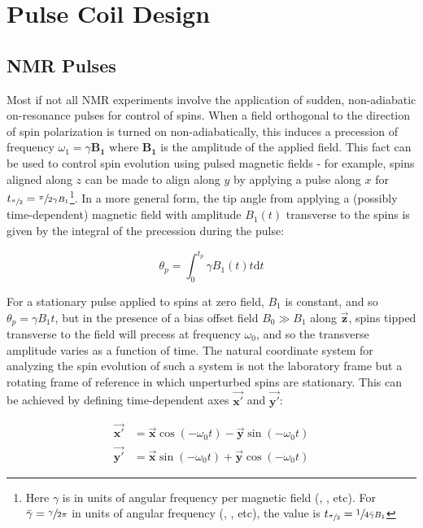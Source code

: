 \documentclass[PaulGanssle-Thesis.tex]{subfiles}
\begin{document}
\section{Pulse Coil Design}
\label{nmr.pulsecoil}
\subsection{NMR Pulses}
Most if not all NMR experiments involve the application of sudden, non-adiabatic on-resonance pulses for control of spins. When a field orthogonal to the direction of spin polarization is turned on non-adiabatically, this induces a precession of frequency $\omega_1 = \gamma\mathbf{B_1}$ where $\mathbf{B_1}$ is the amplitude of the applied field. This fact can be used to control spin evolution using pulsed magnetic fields - for example, spins aligned along $z$ can be made to align along $y$ by applying a pulse along $x$ for $t_{\sfrac{\pi}{2}} = \sfrac{\pi}{2\gamma B_1}$\footnote{Here $\gamma$ is in units of angular frequency per magnetic field (, , etc). For $\bar{\gamma} = \sfrac{\gamma}{2\pi}$ in units of angular frequency (, , etc), the value is $t_{\sfrac{\pi}{2}} = \sfrac{1}{4\bar{\gamma} B_1}$}. In a more general form, the tip angle from applying a (possibly time-dependent) magnetic field with amplitude $B_1(t)$ transverse to the spins is given by the integral of the precession during the pulse:

\begin{equation}
\label{eqn:SpinTipAngle}
\theta_p = \int_0^{t_p}\!\gamma B_1(t)t\mathrm{d}t
\end{equation}

For a stationary pulse applied to spins at zero field, $B_1$ is constant, and so $\theta_p = \gamma B_1 t$, but in the presence of a bias offset field $B_0 \gg B_1$ along $\vec{\mathbf{z}}$, spins tipped transverse to the field will precess at frequency $\omega_0$, and so the transverse amplitude varies as a function of time. The natural coordinate system for analyzing the spin evolution of such a system is not the laboratory frame but a rotating frame of reference in which unperturbed spins are stationary. This can be achieved by defining time-dependent axes $\vec{\mathbf{x'}}$ and $\vec{\mathbf{y'}}$:

\begin{align}
\label{eqn:RotatingFrameXAxis}
\vec{\mathbf{x'}} & =  \vec{\mathbf{x}}\cos\left(-\omega_0 t\right) - \vec{\mathbf{y}}\sin\left(-\omega_0 t\right) \\
\label{eqn:RotatingFrameYAxis}
\vec{\mathbf{y'}} & =  \vec{\mathbf{x}}\sin\left(-\omega_0 t\right) + \vec{\mathbf{y}}\cos\left(-\omega_0 t\right)
\end{align}
\end{document}
